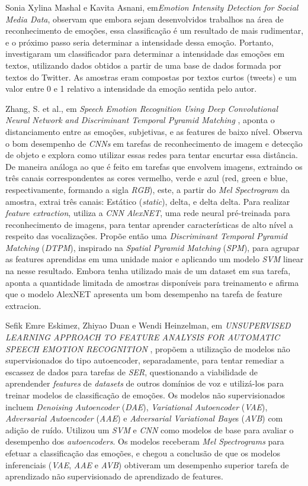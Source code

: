 Sonia Xylina Mashal e Kavita Asnani, em\textit{Emotion Intensity Detection for Social Media Data}\cite{14}, observam que embora sejam desenvolvidos trabalhos na área de reconhecimento de emoções, essa classificação é um resultado de mais rudimentar, e o próximo passo seria determinar a intensidade dessa emoção. Portanto, investigaram um classificador para determinar a intensidade das emoções em textos, utilizando dados obtidos a partir de uma base de dados formada por textos do Twitter. As amostras eram compostas por textos curtos (tweets) e um valor entre 0 e 1 relativo a intensidade da emoção sentida pelo autor.

Zhang, S. et al., em \textit{Speech Emotion Recognition Using Deep Convolutional Neural Network and Discriminant Temporal Pyramid Matching} \cite{32.25}, aponta o distanciamento entre as emoções, subjetivas, e as features de baixo nível. Observa o bom desempenho de \textit{CNNs} em tarefas de reconhecimento de imagem e detecção de objeto e explora como utilizar essas redes para tentar encurtar essa distância. De maneira análoga ao que é feito em tarefas que envolvem imagens, extraindo os três canais correspondentes as cores vermelho, verde e azul (red, green e blue, respectivamente, formando a sigla \textit{RGB}), este, a partir do \textit{Mel Spectrogram} da amostra, extrai três canais: Estático (\textit{static}), delta, e delta delta. Para realizar \textit{feature extraction}, utiliza a \textit{CNN} \textit{AlexNET}, uma rede neural pré-treinada para reconhecimento de imagens, para tentar aprender características de alto nível a respeito das vocalizações. Propõe então uma \textit{Discriminant Temporal Pyramid Matching} (\textit{DTPM}), inspirado na \textit{Spatial Pyramid Matching} (\textit{SPM}), para agrupar as features aprendidas em uma unidade maior e aplicando um modelo \textit{SVM} linear na nesse resultado. Embora tenha utilizado mais de um dataset em sua tarefa, \cite{32.25} aponta a quantidade limitada de amostras disponíveis para treinamento e afirma que o modelo AlexNET apresenta um bom desempenho na tarefa de feature extracion.

Sefik Emre Eskimez, Zhiyao Duan e Wendi Heinzelman, em \textit{UNSUPERVISED LEARNING APPROACH TO FEATURE ANALYSIS FOR AUTOMATIC SPEECH EMOTION RECOGNITION} \cite{34}, propõem a utilização de modelos não supervisionados do tipo autoencoder, separadamente, para tentar remediar a escassez de dados para tarefas de \textit{SER}, questionando a viabilidade de aprendender \textit{features} de \textit{datasets} de outros domínios de voz e utilizá-los para treinar modelos de classificação de emoções. Os modelos não supervisionados incluem\textit{ Denoising Autoencoder} (\textit{DAE}), \textit{Variational Autoencoder} (\textit{VAE}), \textit{Adversarial Autoencoder} (\textit{AAE}) e \textit{Adversarial Variational Baye}s (\textit{AVB}) com adição de ruído. Utilizou um \textit{SVM} e \textit{CNN} como modelos de base para avaliar o desempenho dos \textit{autoencoders}. Os modelos receberam\textit{ Mel Spectrograms} para efetuar a classificação das emoções, e \cite{34} chegou a conclusão de que os modelos inferenciais (\textit{VAE}, \textit{AAE} e \textit{AVB}) obtiveram um desempenho superior tarefa de aprendizado não supervisionado de aprendizado de features.

